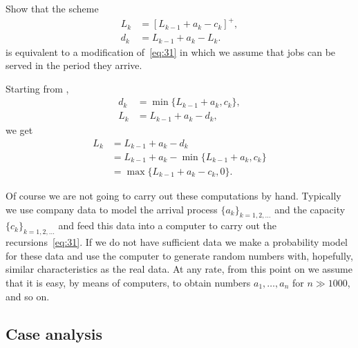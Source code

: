 \begin{exercise}\label{ex:24}
  Show that the scheme
\begin{equation}\label{eq:5}
  \begin{split}
  L_k &= [L_{k-1}+a_k - c_k]^+,\\
  d_k &= L_{k-1} +a_k- L_{k}.
  \end{split}
\end{equation}
is equivalent to a modification of~\eqref{eq:31} in which we assume that jobs can be served in the period they arrive.
\begin{solution}
Starting from ,
  \begin{align*}
    d_k &= \min\{L_{k-1}+a_k, c_k\}, \\
    L_k &= L_{k-1} + a_k - d_k,
  \end{align*}
  we get
  \begin{align*}
    L_k &= L_{k-1} + a_k - d_k \\ 
        &= L_{k-1} + a_k - \min\{L_{k-1}+a_k, c_k\} \\
        &= \max\{L_{k-1} + a_k - c_k, 0 \}.
  \end{align*}
\end{solution}
\end{exercise}



Of course we are not going to carry out these computations by hand.
Typically we use company data to model the arrival process $\{a_k\}_{k=1,2,\ldots}$ and the capacity $\{c_k\}_{k=1,2,\ldots}$ and feed this data into a computer to carry out the recursions~\eqref{eq:31}.
If we do not have sufficient data we make a probability model for these data and use the computer to generate random numbers with, hopefully, similar characteristics as the real data.
At any rate, from this point on we assume that it is easy, by means of computers, to obtain numbers $a_1,\ldots, a_n$ for $n\gg 1000$, and so on.


\subsection*{Case analysis}
\label{sec:case-analysis}


